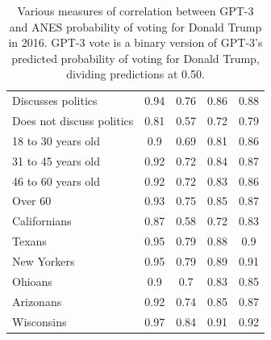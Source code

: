 \documentclass[11pt]{article}
\begin{document}
\begin{table}[t!]
\begin{tabular}{l c c c c }
        Discusses politics & 0.94 & 0.76 & 0.86 & 0.88 \\
        Does not discuss politics & 0.81 & 0.57 & 0.72 & 0.79 \\
        18 to 30 years old & 0.9 & 0.69 & 0.81 & 0.86 \\
        31 to 45 years old & 0.92 & 0.72 & 0.84 & 0.87 \\
        46 to 60 years old & 0.92 & 0.72 & 0.83 & 0.86 \\
        Over 60 & 0.93 & 0.75 & 0.85 & 0.87 \\
        Californians & 0.87 & 0.58 & 0.72 & 0.83 \\
        Texans & 0.95 & 0.79 & 0.88 & 0.9 \\
        New Yorkers & 0.95 & 0.79 & 0.89 & 0.91 \\
        Ohioans & 0.9 & 0.7 & 0.83 & 0.85 \\
        Arizonans & 0.92 & 0.74 & 0.85 & 0.87 \\
        Wisconsins & 0.97 & 0.84 & 0.91 & 0.92 \\ \hline
    \end{tabular}
    \caption{Various measures of correlation between GPT-3 and ANES probability of voting for Donald Trump in 2016. GPT-3 vote is a binary version of GPT-3's predicted probability of voting for Donald Trump, dividing predictions at 0.50.}
\label{tab:anescorr2016}
\end{table}
\end{document}
